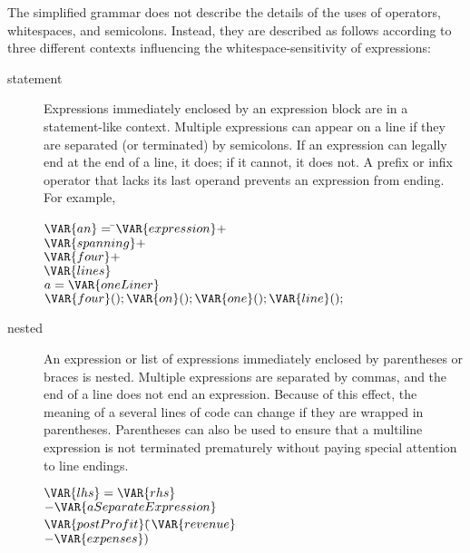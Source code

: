 The simplified grammar does not describe the details of the uses of
operators, whitespaces, and semicolons.
Instead, they are described as follows according to three
different contexts influencing the whitespace-sensitivity of expressions:
\begin{description}
\item[statement] Expressions
immediately enclosed by an expression block are in a statement-like context.
Multiple expressions can appear on a line if they are separated
(or terminated) by semicolons.  If an expression can legally end
at the end of a line, it does; if it cannot, it does not.
A prefix or infix operator that lacks its last operand
prevents an expression from ending.  For example,
\begin{Fortress}
\(\VAR{an} = \null\)\pushtabs\=\+\(\VAR{expression} +\)\\
\(     \VAR{spanning} +\)\\
\(     \VAR{four} +\)\\
\(     \VAR{lines}\)\-\\\poptabs
\(a  = \VAR{oneLiner}\)\\
\(\VAR{four}() ; \VAR{on}(); \VAR{one}(); \VAR{line}();\)
\end{Fortress}

\item[nested]
An expression or list of expressions
immediately enclosed by parentheses or braces
is nested.  Multiple expressions are separated by commas,
and the end of a line does not end an expression.  Because of this
effect, the meaning of a several lines of code can change if they
are wrapped in parentheses.  Parentheses can also be used to ensure
that a multiline expression is not terminated prematurely without
paying special attention to line endings.
%
\begin{Fortress}
\(\VAR{lhs} = \VAR{rhs}\)\\
\(- \VAR{aSeparateExpression}\)\\[4pt]
\(\VAR{postProfit}(\null\)\pushtabs\=\+\(\VAR{revenue}\)\\
\(           - \VAR{expenses})\)\-\\\poptabs
\end{Fortress}


\end{description}
